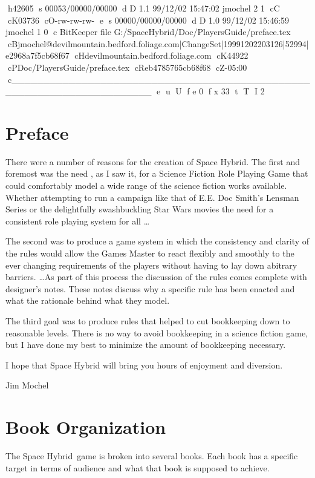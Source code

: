 h42605
s 00053/00000/00000
d D 1.1 99/12/02 15:47:02 jmochel 2 1
cC
cK03736
cO-rw-rw-rw-
e
s 00000/00000/00000
d D 1.0 99/12/02 15:46:59 jmochel 1 0
c BitKeeper file G:/SpaceHybrid/Doc/PlayersGuide/preface.tex
cBjmochel@devilmountain.bedford.foliage.com|ChangeSet|19991202203126|52994|e2968a7f5cb68f67
cHdevilmountain.bedford.foliage.com
cK44922
cPDoc/PlayersGuide/preface.tex
cReb4785765cb68f68
cZ-05:00
c______________________________________________________________________
e
u
U
f e 0
f x 33
t
T
I 2
\chapter*{Preface}

There were a number of reasons for the creation of Space Hybrid. The 
first and foremost was the need , as I saw it, for a Science 
Fiction Role Playing Game that could comfortably model a wide range
of the science fiction works available. Whether attempting to run 
a campaign like that of E.E. Doc Smith's Lensman Series or the 
delightfully swashbuckling {Star Wars} movies the need for a consistent
role playing system for all \dots

The second was to produce a game system in which the consistency 
and clarity of the rules would allow the Games Master to 
react flexibly and smoothly to the ever changing requirements
of the players without having to lay down abitrary barriers.
\dots As part of this process the discussion of the rules comes 
complete with designer's notes. These notes discuss why a 
specific rule has been enacted and what the rationale behind 
what they model. 

The third goal was to produce rules that helped to cut
bookkeeping down to reasonable levels. There is no way to avoid 
bookkeeping in a science fiction game, but I have done my best to
minimize the amount of bookkeeping necessary.

I hope that Space Hybrid will bring you hours of enjoyment and
diversion.

\begin{em}
	Jim Mochel
\end{em}

\chapter*{Book Organization}

The Space Hybrid\ game is broken into several books. Each book has
a specific target in terms of audience and what that book is supposed 
to achieve.

